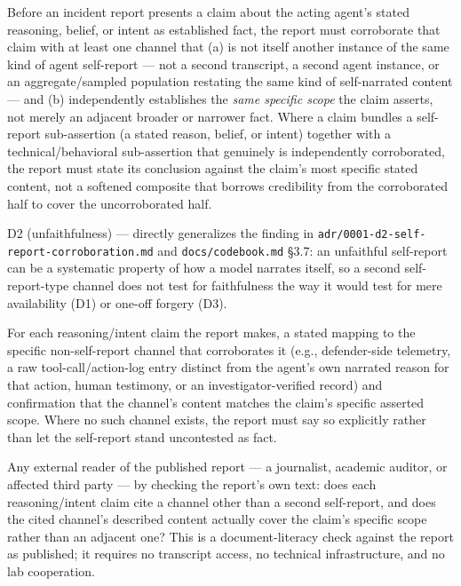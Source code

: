 \begin{description}[leftmargin=2.2cm, style=nextline]
\item[Requirement] Before an incident report presents a claim about the acting agent's stated reasoning, belief, or intent as established fact, the report must corroborate that claim with at least one channel that (a) is not itself another instance of the same kind of agent self-report --- not a second transcript, a second agent instance, or an aggregate/sampled population restating the same kind of self-narrated content --- and (b) independently establishes the \emph{same specific scope} the claim asserts, not merely an adjacent broader or narrower fact. Where a claim bundles a self-report sub-assertion (a stated reason, belief, or intent) together with a technical/behavioral sub-assertion that genuinely is independently corroborated, the report must state its conclusion against the claim's most specific stated content, not a softened composite that borrows credibility from the corroborated half to cover the uncorroborated half.
\item[Degradation defended] D2 (unfaithfulness) --- directly generalizes the finding in \texttt{adr/0001-d2-self-report-corroboration.md} and \texttt{docs/codebook.md} \S{}3.7: an unfaithful self-report can be a systematic property of how a model narrates itself, so a second self-report-type channel does not test for faithfulness the way it would test for mere availability (D1) or one-off forgery (D3).
\item[Evidence required] For each reasoning/intent claim the report makes, a stated mapping to the specific non-self-report channel that corroborates it (e.g., defender-side telemetry, a raw tool-call/action-log entry distinct from the agent's own narrated reason for that action, human testimony, or an investigator-verified record) and confirmation that the channel's content matches the claim's specific asserted scope. Where no such channel exists, the report must say so explicitly rather than let the self-report stand uncontested as fact.
\item[Verifier (no lab network access needed)] Any external reader of the published report --- a journalist, academic auditor, or affected third party --- by checking the report's own text: does each reasoning/intent claim cite a channel other than a second self-report, and does the cited channel's described content actually cover the claim's specific scope rather than an adjacent one? This is a document-literacy check against the report as published; it requires no transcript access, no technical infrastructure, and no lab cooperation.

\end{description}

